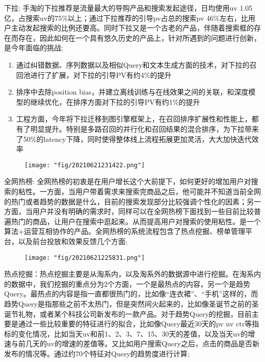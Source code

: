 下拉: 手淘的下拉推荐是流量最大的导购产品和搜索发起途径，日均使用uv 1.05亿，占搜索uv的75\%以上；通过下拉推荐的引导pv占总的搜索pv 46\%左右，比用户主动发起搜索的比例还要高。同时下拉又是一个古老的产品，伴随着搜索框的存在而存在，因此如何在一个具有悠久历史的产品上，针对所遇到的问题进行创新，是今年面临的挑战;
\begin{enumerate}
	\item 通过纠错数据、序列数据以及相似Query和文本生成方面的技术，对下拉的召回池进行了扩展，对下拉的引导PV有约4\%的提升

	\item 排序中去除position bias，并建立离线训练与在线效果之间的关联，和深度模型的继续优化，在排序方面对下拉的引导PV有约1\%的提升

	\item 工程方面，今年将下拉迁移到图引擎框架上，在召回排序扩展性和性能上，都有了明显提升。特别是多路召回的并行化和召回结果的混合排序，为下拉带来了50\%的latency下降，同时使得整体线上流程拓展更加灵活，大大加快迭代效率
\end{enumerate}

\begin{figure}[!h]
	\centering
	\texttt{[image: "fig/20210621231422.png"]}
	\caption{}
	\label{fig:20210621231422}
\end{figure}


全网热榜: 全网热榜的初衷是在用户增长这个大前提下，如何更好的增加用户对搜索的粘性。一方面，当用户带着需求来搜索完商品之后，他可能并不知道当前全网的热门或者趋势的数据是什么，目前的搜索发现部分比较强调个性化的因素；另一方面，当用户并没有明确的需求时，同样可以在全网热榜下面找到一些目前比较普遍热门的商品，让用户在搜索中逛起来。从而提高用户对搜索的使用粘性。是一个算法+运营互相协作的产品。全网热榜的系统流程包含了热点挖掘、榜单管理平台，以及前台投放和效果反馈几个方面; 

\begin{figure}[!h]
	\centering
	\texttt{[image: "fig/20210621225831.png"]}
	\caption{}
	\label{fig:20210621225831}
\end{figure}

热点挖掘：热点挖掘主要是从淘系内，以及淘系外的数据源中进行挖掘。在淘系内的数据中，我们挖掘的重点分为2个方面，一个是最热点的内容，另一个是趋势Query。最热点的内容是指一直都很热门的，比如像“连衣裙”、“手机”这样的，而趋势Query是指那些之前不太热门，但是突然间火起来的，比如像圣诞节之前的圣诞节礼物，或者某个科技公司新发布的一款产品。对于趋势Query的挖掘，目前主要是通过一些比较重要的特征进行的拟合，比如像Query最近30天的pv uv ctr等指标的变化情况，比如当天uv和前1、2、3、7、15、30天的差值，以及当天uv的增速与前几天的uv的增速的差值等。又比如用户搜索Query之后，点击的商品是否新发布的情况等。通过约70个特征对Query的趋势度进行计算; 

